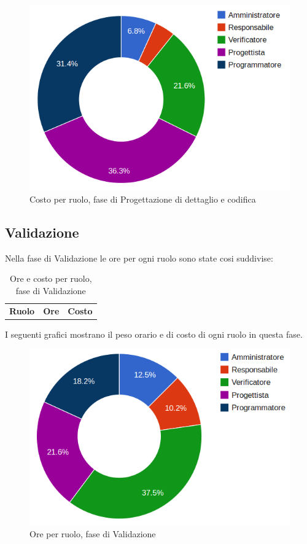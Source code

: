 \begin{figure}[H]
\centering
\includegraphics[scale=0.35]{5-3-2.png}
\caption{Costo per ruolo, fase di Progettazione di dettaglio e codifica\label{fig:nome}}
\end{figure}

\subsection{Validazione}

Nella fase di Validazione le ore per ogni ruolo sono state cosi suddivise:

\begin{table}[H]
	\centering
	\begin{tabular}{ l c c }
	\textbf{Ruolo} & \textbf{Ore} & \textbf{Costo} \\
	
		
	
	\end{tabular}
	\caption{Ore e costo per ruolo, fase di Validazione}
	\end{table}

I seguenti grafici mostrano il peso orario e di costo di ogni ruolo in questa fase.

\begin{figure}[H]
\centering
\includegraphics[scale=0.35]{5-4-1.png}
\caption{Ore per ruolo, fase di Validazione\label{fig:nome}}
\end{figure}


